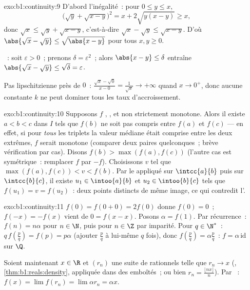 \begin{solution}{exo:b1:continuity:9}
D'abord l'inégalité~: pour $0 \leq y \leq x$,
\[
\bigl(\sqrt y + \sqrt{x - y}\bigr)^2 = x + 2\sqrt{y(x-y)} \geq x,
\]
donc $\sqrt x \leq \sqrt y + \sqrt{x - y}$, c'est-à-dire $\sqrt x -
\sqrt y \leq \sqrt{x - y}$. D'où $\abs{\sqrt x - \sqrt y} \leq
\sqrt{\abs{x - y}}$ pour tous $x, y \geq 0$.

~: soit $\varepsilon > 0$~; prenons $\delta =
\varepsilon^2$~; alors $\abs{x - y} \leq \delta$ entraîne $\abs{\sqrt x
- \sqrt y} \leq \sqrt\delta = \varepsilon$.

Pas lipschitzienne près de $0$~: $\frac{\sqrt x - \sqrt 0}{x - 0} =
\frac{1}{\sqrt x} \to +\infty$ quand $x \to 0^+$, donc aucune constante
$k$ ne peut dominer tous les taux d'accroissement.
\end{solution}

\begin{solution}{exo:b1:continuity:10}
Supposons $f$ , , et non strictement monotone. Alors
il existe $a < b < c$ dans $I$ tels que $f(b)$ ne soit pas compris
entre $f(a)$ et $f(c)$ --- en effet, si pour \emph{tous} les triplets
la valeur médiane était comprise entre les deux extrêmes, $f$ serait
monotone (comparer deux paires quelconques~; brève vérification par
cas). Disons $f(b) > \max(f(a), f(c))$ (l'autre cas est symétrique~:
remplacer $f$ par $-f$). Choisissons $v$ tel que $\max(f(a), f(c)) < v
< f(b)$. Par le  appliqué sur
$\intcc{a}{b}$ puis sur $\intcc{b}{c}$, il existe $u_1 \in
\intoo{a}{b}$ et $u_2 \in \intoo{b}{c}$ tels que $f(u_1) = v = f(u_2)$~:
deux points distincts de même image, ce qui contredit l'.
\end{solution}

\begin{solution}{exo:b1:continuity:11}
$f(0) = f(0+0) = 2f(0)$ donne $f(0) = 0$~; $f(-x) = -f(x)$ vient de $0 =
f(x - x)$. Posons $\alpha = f(1)$. Par récurrence~: $f(n) = n\alpha$
pour $n \in \N$, puis pour $n \in \Z$ par imparité. Pour $q \in \N^*$~:
$q\,f(\frac pq) = f(p) = p\alpha$ (ajouter $\frac pq$ à lui-même $q$
fois), donc $f(\frac pq) = \alpha\frac pq$~: $f = \alpha\,
\mathrm{id}$ sur $\Q$.

Soient maintenant $x \in \R$ et $(r_n)$ une suite de rationnels telle
que $r_n \to x$ (, \cref{thm:b1:reals:density}, appliquée dans
des  emboîtés~; ou bien $r_n = \frac{\lfloor
nx\rfloor}{n}$). Par ~: $f(x) = \lim f(r_n) = \lim \alpha r_n
= \alpha x$.
\end{solution}

